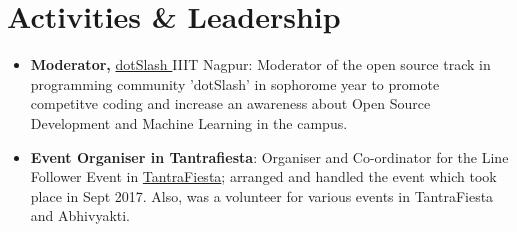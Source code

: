 \documentclass[a4paper,10pt]{extarticle} %
\begin{document}

\vspace{-0.3cm}
\section{\textcolor{primary}{Activities \& Leadership}}

\begin{itemize}[leftmargin=0.55cm, rightmargin=0.2cm, label={\Large\textbullet}]
\item \textbf{Moderator, }\href{https://google.com/}{ dotSlash  }IIIT Nagpur: Moderator of the open source track in programming community 'dotSlash' in sophorome year to promote competitve coding and increase an awareness about Open Source Development and Machine Learning in the campus.
\item \textbf{Event Organiser in Tantrafiesta}: Organiser and Co-ordinator for the Line Follower Event in \href{https://google.com}{TantraFiesta}; arranged and handled the event which took place in Sept 2017. Also, was a volunteer for various events in TantraFiesta and Abhivyakti.
\\
\end{itemize}








\end{document}
